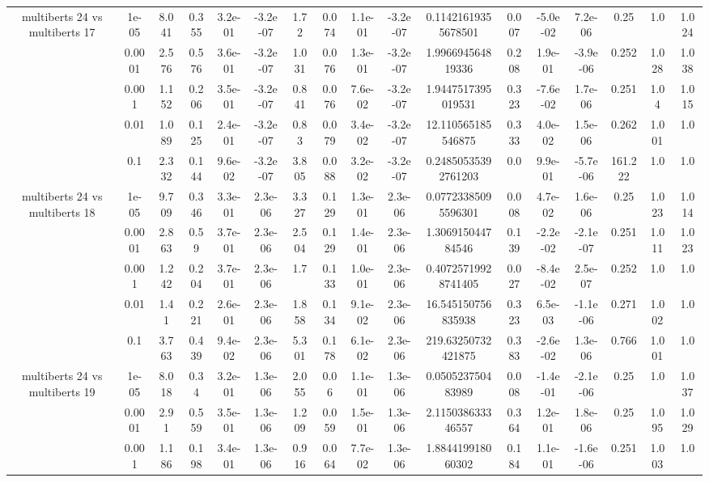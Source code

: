 \begin{tabular}{|c|c|c|c|c|c|c|c|c|c|c|c|c|c|c|c|c|}
\hline
\multirow{5}{*}{multiberts 24 vs multiberts 17} & 1e-05 & 8.041 & 0.355 & 3.2e-01 & -3.2e-07 & 1.72 & 0.074 & 1.1e-01 & -3.2e-07 & 0.11421619355678501 & 0.007 & -5.0e-02 & 7.2e-06 & 0.25 & 1.0 & 1.024 \\
 & 0.0001 & 2.576 & 0.576 & 3.6e-01 & -3.2e-07 & 1.031 & 0.076 & 1.3e-01 & -3.2e-07 & 1.996694564819336 & 0.208 & 1.9e-01 & -3.9e-06 & 0.252 & 1.028 & 1.038 \\
 & 0.001 & 1.152 & 0.206 & 3.5e-01 & -3.2e-07 & 0.841 & 0.076 & 7.6e-02 & -3.2e-07 & 1.9447517395019531 & 0.323 & -7.6e-02 & 1.7e-06 & 0.251 & 1.04 & 1.015 \\
 & 0.01 & 1.089 & 0.125 & 2.4e-01 & -3.2e-07 & 0.83 & 0.079 & 3.4e-02 & -3.2e-07 & 12.110565185546875 & 0.333 & 4.0e-02 & 1.5e-06 & 0.262 & 1.001 & 1.0 \\
 & 0.1 & 2.332 & 0.144 & 9.6e-02 & -3.2e-07 & 3.805 & 0.088 & 3.2e-02 & -3.2e-07 & 0.24850535392761203 & 0.0 & 9.9e-01 & -5.7e-06 & 161.222 & 1.0 & 1.0 \\
\hline
\multirow{5}{*}{multiberts 24 vs multiberts 18} & 1e-05 & 9.709 & 0.346 & 3.3e-01 & 2.3e-06 & 3.327 & 0.129 & 1.3e-01 & 2.3e-06 & 0.07723385095596301 & 0.008 & 4.7e-02 & 1.6e-06 & 0.25 & 1.023 & 1.014 \\
 & 0.0001 & 2.863 & 0.59 & 3.7e-01 & 2.3e-06 & 2.504 & 0.129 & 1.4e-01 & 2.3e-06 & 1.306915044784546 & 0.139 & -2.2e-02 & -2.1e-07 & 0.251 & 1.011 & 1.023 \\
 & 0.001 & 1.242 & 0.204 & 3.7e-01 & 2.3e-06 & 1.7 & 0.133 & 1.0e-01 & 2.3e-06 & 0.40725719928741405 & 0.027 & -8.4e-02 & 2.5e-07 & 0.252 & 1.0 & 1.0 \\
 & 0.01 & 1.41 & 0.221 & 2.6e-01 & 2.3e-06 & 1.858 & 0.134 & 9.1e-02 & 2.3e-06 & 16.545150756835938 & 0.323 & 6.5e-03 & -1.1e-06 & 0.271 & 1.002 & 1.0 \\
 & 0.1 & 3.763 & 0.439 & 9.4e-02 & 2.3e-06 & 5.301 & 0.178 & 6.1e-02 & 2.3e-06 & 219.63250732421875 & 0.383 & -2.6e-02 & 1.3e-06 & 0.766 & 1.001 & 1.0 \\
\hline
\multirow{5}{*}{multiberts 24 vs multiberts 19} & 1e-05 & 8.018 & 0.34 & 3.2e-01 & 1.3e-06 & 2.055 & 0.06 & 1.1e-01 & 1.3e-06 & 0.050523750483989 & 0.008 & -1.4e-01 & -2.1e-06 & 0.25 & 1.0 & 1.037 \\
 & 0.0001 & 2.91 & 0.559 & 3.5e-01 & 1.3e-06 & 1.209 & 0.059 & 1.5e-01 & 1.3e-06 & 2.115038633346557 & 0.364 & 1.2e-01 & 1.8e-06 & 0.25 & 1.095 & 1.029 \\
 & 0.001 & 1.186 & 0.198 & 3.4e-01 & 1.3e-06 & 0.916 & 0.064 & 7.7e-02 & 1.3e-06 & 1.884419918060302 & 0.184 & 1.1e-01 & -1.6e-06 & 0.251 & 1.003 & 1.0 \\

\end{tabular}
